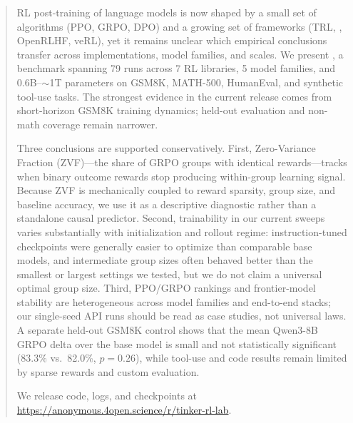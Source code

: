 \begin{abstract}
RL post-training of language models is now shaped by a small set of
algorithms (PPO, GRPO, DPO) and a growing set of frameworks (TRL,
\tinker{}, OpenRLHF, veRL), yet it remains unclear which empirical conclusions
transfer across implementations, model families, and scales. We present
\ours{}, a benchmark spanning 79 runs across 7 RL libraries, 5 model
families, and 0.6B--$\sim$1T parameters on GSM8K, MATH-500, HumanEval, and
synthetic tool-use tasks. The strongest evidence in the current release comes
from short-horizon GSM8K training dynamics; held-out evaluation and non-math
coverage remain narrower.

Three conclusions are supported conservatively. First, Zero-Variance Fraction
(ZVF)---the share of GRPO groups with identical rewards---tracks when binary
outcome rewards stop producing within-group learning signal. Because ZVF is
mechanically coupled to reward sparsity, group size, and baseline accuracy, we
use it as a descriptive diagnostic rather than a standalone causal predictor.
Second, trainability in our current sweeps varies substantially with
initialization and rollout regime: instruction-tuned checkpoints were
generally easier to optimize than comparable base models, and intermediate
group sizes often behaved better than the smallest or largest settings we
tested, but we do not claim a universal optimal group size. Third, PPO/GRPO
rankings and frontier-model stability are heterogeneous across model families
and end-to-end stacks; our single-seed API runs should be read as case studies,
not universal laws. A separate held-out GSM8K control shows that the mean
Qwen3-8B GRPO delta over the base model is small and not statistically
significant (83.3\% vs.\ 82.0\%, $p{=}0.26$), while tool-use and code results
remain limited by sparse rewards and custom evaluation.

We release code, logs, and checkpoints at
\url{https://anonymous.4open.science/r/tinker-rl-lab}.
\end{abstract}
